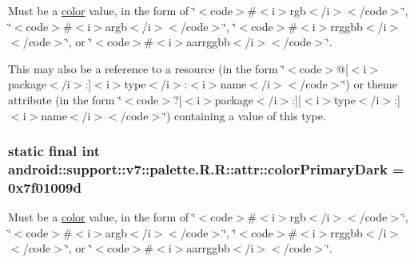 Must be a \hyperlink{classandroid_1_1support_1_1v7_1_1palette_1_1_r_1_1color}{color} value, in the form of \char`\"{}$<$code$>$\#$<$i$>$rgb$<$/i$>$$<$/code$>$\char`\"{}, \char`\"{}$<$code$>$\#$<$i$>$argb$<$/i$>$$<$/code$>$\char`\"{}, \char`\"{}$<$code$>$\#$<$i$>$rrggbb$<$/i$>$$<$/code$>$\char`\"{}, or \char`\"{}$<$code$>$\#$<$i$>$aarrggbb$<$/i$>$$<$/code$>$\char`\"{}. 

This may also be a reference to a resource (in the form \char`\"{}$<$code$>$@\mbox{[}$<$i$>$package$<$/i$>$:\mbox{]}$<$i$>$type$<$/i$>$:$<$i$>$name$<$/i$>$$<$/code$>$\char`\"{}) or theme attribute (in the form \char`\"{}$<$code$>$?\mbox{[}$<$i$>$package$<$/i$>$:\mbox{]}\mbox{[}$<$i$>$type$<$/i$>$:\mbox{]}$<$i$>$name$<$/i$>$$<$/code$>$\char`\"{}) containing a value of this type. \hypertarget{classandroid_1_1support_1_1v7_1_1palette_1_1_r_1_1attr_c3cf8c7e5077fd56d690e7404216f2e0}{
\subsubsection[{colorPrimaryDark}]{\setlength{\rightskip}{0pt plus 5cm}static final int android::support::v7::palette.R.R::attr::colorPrimaryDark = 0x7f01009d}}
\label{classandroid_1_1support_1_1v7_1_1palette_1_1_r_1_1attr_c3cf8c7e5077fd56d690e7404216f2e0}


Must be a \hyperlink{classandroid_1_1support_1_1v7_1_1palette_1_1_r_1_1color}{color} value, in the form of \char`\"{}$<$code$>$\#$<$i$>$rgb$<$/i$>$$<$/code$>$\char`\"{}, \char`\"{}$<$code$>$\#$<$i$>$argb$<$/i$>$$<$/code$>$\char`\"{}, \char`\"{}$<$code$>$\#$<$i$>$rrggbb$<$/i$>$$<$/code$>$\char`\"{}, or \char`\"{}$<$code$>$\#$<$i$>$aarrggbb$<$/i$>$$<$/code$>$\char`\"{}. 

